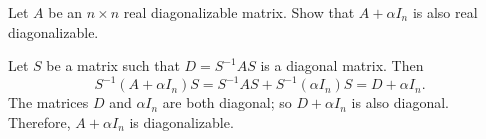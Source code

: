 \documentclass{ximera}
\begin{document}
\begin{exercise} \label{c10.3.6}
Let $A$ be an $n\times n$ real diagonalizable matrix. Show that $A+\alpha I_n$
is also real diagonalizable.

\begin{solution}

Let $S$ be a matrix such that $D = S^{-1}AS$ is a diagonal matrix.
Then
\[
S^{-1}(A + \alpha I_n)S = S^{-1}AS + S^{-1}(\alpha I_n)S =
D + \alpha I_n.
\]
The matrices $D$ and $\alpha I_n$ are both diagonal; so $D + \alpha I_n$
is also diagonal.  Therefore, $A + \alpha I_n$ is diagonalizable.


\end{solution}
\end{exercise}
\end{document}
